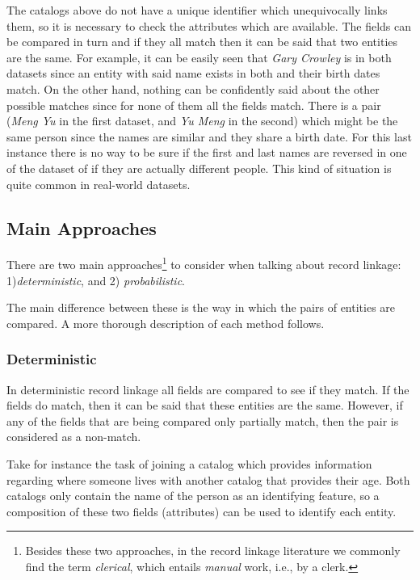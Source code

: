 \documentclass[epsfig,a4paper,11pt,titlepage,twoside,openany]{book}
\begin{document}
The catalogs above do not have a unique identifier which unequivocally links them, so it is necessary to check the attributes which are available. The fields can be compared in turn and if they all match then it can be said that two entities are the same. For example, it can be easily seen that \textit{Gary Crowley} is in both datasets since an entity with said name exists in both and their birth dates match. On the other hand, nothing can be confidently said about the other possible matches since for none of them all the fields match. There is a pair (\textit{Meng Yu} in the first dataset, and \textit{Yu Meng} in the second) which might be the same person since the names are similar and they share a birth date. For this last instance there is no way to be sure if the first and last names are reversed in one of the dataset of if they are actually different people. This kind of situation is quite common in real-world datasets.





\subsection{Main Approaches}
\label{sec:rl-main-approaches}

There are two main approaches\footnote{Besides these two approaches, in the record linkage literature we commonly find the term \textit{clerical}, which entails \textit{manual} work, i.e., by a clerk.} to consider when talking about record linkage: 1)\textit{deterministic}, and 2) \textit{probabilistic}. 

The main difference between these is the way in which the pairs of entities are compared. A more thorough description of each method follows.


\subsubsection{Deterministic}
\label{sec:rl-approach-deterministic}

In deterministic record linkage all fields are compared to see if they match. If the fields do match, then it can be said that these entities are the same. However, if any of the fields that are being compared only partially match, then the pair is considered as a non-match. 

Take for instance the task of joining a catalog which provides information regarding where someone
lives with another catalog that provides their age. Both catalogs only contain the
name of the person as an identifying feature, so a composition of
these two fields (attributes) can be used to identify each entity.
\end{document}
